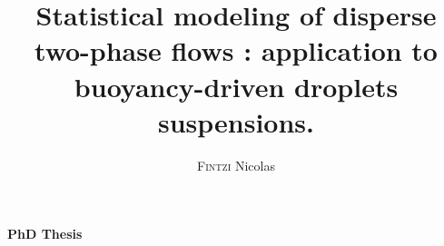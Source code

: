 \makeatletter
\begin{titlepage}

\begin{table}[h!]
\begin{minipage}[h]{0.5\linewidth}
\end{minipage}
\hspace{1cm}
\begin{minipage}[h]{0.5\linewidth}
\end{minipage}
\end{table}

\vfill

\begin{center}
{\Large\textbf{PhD Thesis}}\\

\vspace{3em}
\vspace{10pt}
\title{Statistical modeling of disperse two-phase flows : application to buoyancy-driven droplets suspensions.}
{\huge\textbf{\@title}} \\
\vspace{10pt}


\vspace{2em}
\author{\textsc{Fintzi} Nicolas}
{\LARGE \@author}

\vspace{3em}
{\large\textbf{\@date}}\\
\end{center}


\vfill




\vspace{1em}


\end{titlepage}
